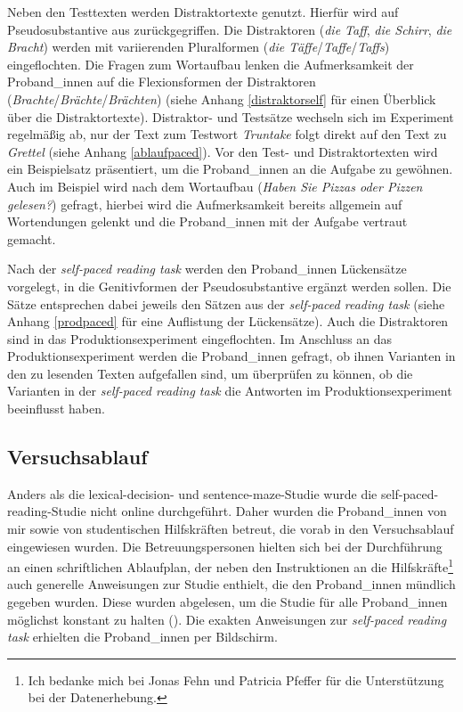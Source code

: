 Neben den Testtexten werden Distraktortexte genutzt. Hierfür wird auf Pseudosubstantive aus \textcite{Kopcke.2000b} zurückgegriffen. Die Distraktoren (\textit{die Taff}, \textit{die Schirr}, \textit{die Bracht}) werden mit variierenden Pluralformen (\textit{die Täffe}/\textit{Taffe}/\textit{Taffs}) eingeflochten. Die Fragen zum Wortaufbau lenken die Aufmerksamkeit der Proband\_innen auf die Flexionsformen der Distraktoren (\textit{Brachte}/\textit{Brächte}/\textit{Brächten}) (siehe Anhang \ref{distraktorself} für einen Überblick über die Distraktortexte). Distraktor- und Testsätze wechseln sich im Experiment regelmäßig ab, nur der Text zum Testwort \textit{Truntake} folgt direkt auf den Text zu \textit{Grettel} (siehe Anhang \ref{ablaufpaced}).  Vor den Test- und Distraktortexten wird ein Beispielsatz präsentiert, um die Proband\_innen an die Aufgabe zu gewöhnen. Auch im Beispiel wird nach dem Wortaufbau (\textit{Haben Sie Pizzas oder Pizzen gelesen?}) gefragt, hierbei wird die Aufmerksamkeit bereits allgemein auf Wortendungen gelenkt und die Proband\_innen mit der Aufgabe vertraut gemacht. 



Nach der \textit{self-paced reading task} werden den Proband\_innen Lückensätze vorgelegt, in die Genitivformen der Pseudosubstantive ergänzt werden sollen. Die Sätze entsprechen dabei jeweils den Sätzen aus der \textit{self-paced reading task} (siehe Anhang \ref{prodpaced} für eine Auflistung der Lückensätze). Auch die Distraktoren sind in das Produktionsexperiment eingeflochten. Im Anschluss an das Produktionsexperiment werden die Proband\_innen gefragt, ob ihnen Varianten in den zu lesenden Texten aufgefallen sind, um überprüfen zu können, ob die Varianten in der \textit{self-paced reading task} die Antworten im Produktionsexperiment beeinflusst haben.


\subsection{Versuchsablauf}

Anders als die lexical-decision- und sentence-maze-Studie wurde die self-paced-reading-Studie nicht online durchgeführt. Daher wurden die Proband\_innen von mir sowie von studentischen Hilfskräften betreut, die vorab in den Versuchsablauf eingewiesen wurden. Die Betreuungspersonen hielten sich bei der Durchführung an einen schriftlichen Ablaufplan, der neben den Instruktionen an die Hilfskräfte\footnote{Ich bedanke mich bei Jonas Fehn und  Patricia Pfeffer für die Unterstützung bei der Datenerhebung.} auch generelle Anweisungen zur Studie enthielt, die den Pro\-\mbox{band\_in}\-nen mündlich gegeben wurden. Diese wurden abgelesen, um die Studie für alle Proband\_innen möglichst konstant zu halten (\cite[215]{Hohle.2010}). Die exakten Anweisungen zur \textit{self-paced reading task} erhielten die Proband\_innen per Bildschirm.

